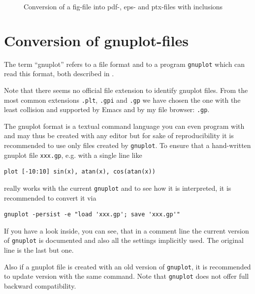 \documentclass[12pt]{book}
\begin{document}
\begin{figure}[htb]
\centering
{}
\caption{\label{fig:fig2dev}Conversion of a fig-file 
into pdf-, eps- and ptx-files with inclusions}
\end{figure}


\section{Conversion of gnuplot-files}\label{sec:gnuplot2dev}

The term ``gnuplot'' refers to a file format
and to a program \texttt{gnuplot}
which can read this format, both described in \cite{GnuPlot}. 

Note that there seems no official file extension 
to identify gnuplot files. 
From the most common extensions \texttt{.plt}, \texttt{.gpi} and \texttt{.gp} 
we have chosen the one with the least collision 
and supported by Emacs and by my file browser: \texttt{.gp}. 

The gnuplot format is a textual command language you can even program with 
and may thus be created with any editor but
for sake of reproducibility it is recommended to use only files
created by \texttt{gnuplot}.
To ensure that a hand-written gnuplot file \texttt{xxx.gp},
e.g. with a single line like
%
\begin{verbatim}
plot [-10:10] sin(x), atan(x), cos(atan(x))
\end{verbatim}
%
really works
with the current \texttt{gnuplot} and to see how it is interpreted,
it is recommended to convert it via
%
\begin{lstlisting}
gnuplot -persist -e "load 'xxx.gp'; save 'xxx.gp'"
\end{lstlisting}
%
If you have a look inside, you can see, that in a comment line
the current version of \texttt{gnuplot} is documented
and also all the settings implicitly used.
The original line is the last but one.

Also if a gnuplot file is created with an old version of \texttt{gnuplot},
it is recommended to update version with the same command.
Note that \texttt{gnuplot} does not offer full backward compatibility. 
\end{document}
